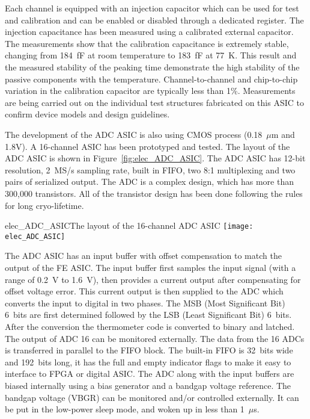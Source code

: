 Each channel is equipped with an injection capacitor which can be used
for test and calibration and can be enabled or disabled through a
dedicated register. The injection capacitance has been measured using 
a calibrated external capacitor. The measurements show
that the calibration capacitance is extremely stable, changing from
184~fF at room temperature to 183~fF at 77~K. This result and the measured
stability of the peaking time demonstrate the high stability of the
passive components with the temperature. Channel-to-channel and chip-to-chip
variation in the calibration capacitor are typically less than 1\%. Measurements are being carried
out on the individual test structures fabricated on this ASIC to
confirm device models and design guidelines.

The development of the ADC ASIC is also using CMOS process (0.18~$\mu$m and 1.8V).
A 16-channel ASIC has been prototyped and tested.
The layout of the ADC ASIC is shown in Figure~\ref{fig:elec_ADC_ASIC}. 
The ADC ASIC has 12-bit resolution, 2~MS/s sampling rate, built in FIFO, two 8:1 multiplexing and two pairs of serialized output.
The ADC is a complex design, which has more than 300,000 transistors.
All of the transistor design has been done following the rules for long cryo-lifetime.

\begin{cdrfigure}{elec_ADC_ASIC}{The layout of the 16-channel ADC ASIC}
\texttt{[image: elec\_ADC\_ASIC]} %
\end{cdrfigure}

The ADC ASIC has an input buffer with offset compensation to match the output of the FE ASIC.
The input buffer first samples the input signal (with a range of 0.2~V to 1.6~V),
then provides a current output after compensating for offset voltage error.
This current output is then supplied to the ADC which converts the input to digital in two phases.
The MSB (Most Significant Bit) 6~bits are first determined followed by the LSB (Least Significant Bit) 6~bits.
After the conversion the thermometer code is converted to binary and latched.
The output of ADC 16 can be monitored externally.
The data from the 16 ADCs is transferred in parallel to the FIFO block.
The built-in FIFO is 32~bits wide and 192~bits long,
it has the full and empty indicator flags to make it easy to interface to FPGA or digital ASIC.
The ADC along with the input buffers are biased internally using a bias generator and a bandgap voltage reference.
The bandgap voltage (VBGR) can be monitored and/or controlled externally.
It can be put in the low-power sleep mode, and woken up in less than 1~$\mu$s.

